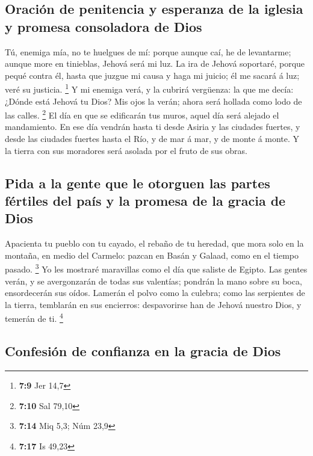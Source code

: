 \hypertarget{oraciuxf3n-de-penitencia-y-esperanza-de-la-iglesia-y-promesa-consoladora-de-dios}{%
\subsection{Oración de penitencia y esperanza de la iglesia y promesa
consoladora de
Dios}\label{oraciuxf3n-de-penitencia-y-esperanza-de-la-iglesia-y-promesa-consoladora-de-dios}}

 Tú, enemiga mía, no te huelgues de mí: porque aunque caí,
he de levantarme; aunque more en tinieblas, Jehová será mi luz.
 La ira de Jehová soportaré, porque pequé contra él, hasta
que juzgue mi causa y haga mi juicio; él me sacará á luz; veré su
justicia. \footnote{\textbf{7:9} Jer 14,7}  Y mi enemiga
verá, y la cubrirá vergüenza: la que me decía: ¿Dónde está Jehová tu
Dios? Mis ojos la verán; ahora será hollada como lodo de las calles.
\footnote{\textbf{7:10} Sal 79,10}  El día en que se
edificarán tus muros, aquel día será alejado el mandamiento.
 En ese día vendrán hasta ti desde Asiria y las ciudades
fuertes, y desde las ciudades fuertes hasta el Río, y de mar á mar, y de
monte á monte.  Y la tierra con sus moradores será
asolada por el fruto de sus obras.

\hypertarget{pida-a-la-gente-que-le-otorguen-las-partes-fuxe9rtiles-del-pauxeds-y-la-promesa-de-la-gracia-de-dios}{%
\subsection{Pida a la gente que le otorguen las partes fértiles del país
y la promesa de la gracia de
Dios}\label{pida-a-la-gente-que-le-otorguen-las-partes-fuxe9rtiles-del-pauxeds-y-la-promesa-de-la-gracia-de-dios}}

 Apacienta tu pueblo con tu cayado, el rebaño de tu
heredad, que mora solo en la montaña, en medio del Carmelo: pazcan en
Basán y Galaad, como en el tiempo pasado. \footnote{\textbf{7:14} Miq
  5,3; Núm 23,9}  Yo les mostraré maravillas como el día
que saliste de Egipto.  Las gentes verán, y se
avergonzarán de todas sus valentías; pondrán la mano sobre su boca,
ensordecerán sus oídos.  Lamerán el polvo como la
culebra; como las serpientes de la tierra, temblarán en sus encierros:
despavorirse han de Jehová nuestro Dios, y temerán de ti. \footnote{\textbf{7:17}
  Is 49,23}

\hypertarget{confesiuxf3n-de-confianza-en-la-gracia-de-dios}{%
\subsection{Confesión de confianza en la gracia de
Dios}\label{confesiuxf3n-de-confianza-en-la-gracia-de-dios}}

